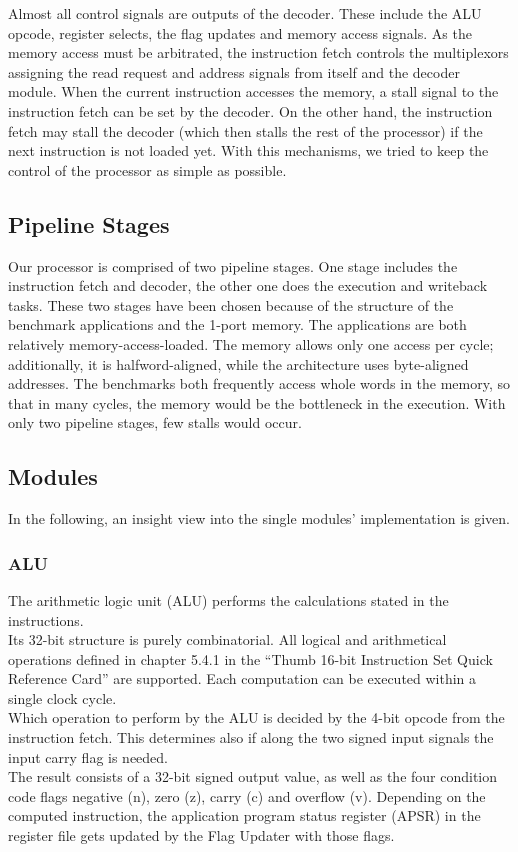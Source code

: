 Almost all control signals are outputs of the decoder. These include the ALU opcode, register selects, the flag updates and memory access signals. As the memory access must be arbitrated, the instruction fetch controls the multiplexors assigning the read request and address signals from itself and the decoder module. When the current instruction accesses the memory, a stall signal to the instruction fetch can be set by the decoder. On the other hand, the instruction fetch may stall the decoder (which then stalls the rest of the processor) if the next instruction is not loaded yet. With this mechanisms, we tried to keep the control of the processor as simple as possible.

\subsection{Pipeline Stages}
\label{subsec:pipelinestages}

Our processor is comprised of two pipeline stages. One stage includes the instruction fetch and decoder, the other one does the execution and writeback tasks. These two stages have been chosen because of the structure of the benchmark applications and the 1-port memory. The applications are both relatively memory-access-loaded. The memory allows only one access per cycle; additionally, it is halfword-aligned, while the architecture uses byte-aligned addresses. The benchmarks both frequently access whole words in the memory, so that in many cycles, the memory would be the bottleneck in the execution. With only two pipeline stages, few stalls would occur. 

\subsection{Modules}
\label{subsec:modules}
In the following, an insight view into the single modules' implementation is given.

\subsubsection{ALU}
\label{subsubsec:alu}
The arithmetic logic unit (ALU) performs the calculations stated in the instructions.\\
Its 32-bit structure is purely combinatorial. All logical and arithmetical operations defined in chapter 5.4.1 in the ``Thumb 16-bit Instruction Set Quick Reference Card'' are supported. Each computation can be executed within a single clock cycle.\\
\newline
Which operation to perform by the ALU is decided by the 4-bit opcode from the instruction fetch. This determines also if along the two signed input signals the input carry flag is needed.\\
The result consists of a 32-bit signed output value, as well as the four condition code flags negative (n), zero (z), carry (c) and overflow (v). Depending on the computed instruction, the application program status register (APSR) in the register file gets updated by the Flag Updater with those flags.


